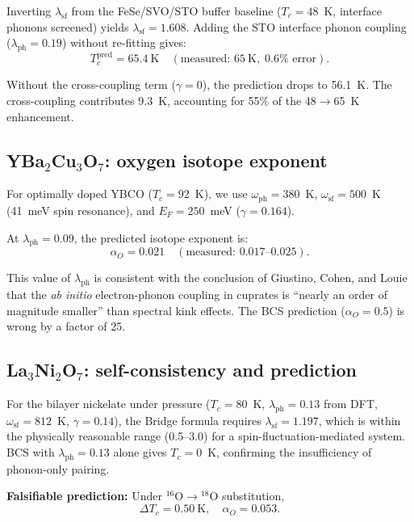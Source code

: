 \documentclass[twocolumn,showpacs,preprintnumbers,amsmath,amssymb,prb]{revtex4-2}
\begin{document}
Inverting $\lambda_{\mathrm{sf}}$ from the FeSe/SVO/STO buffer baseline ($T_c = 48$~K, interface phonons screened) yields $\lambda_{\mathrm{sf}} = 1.608$.
Adding the STO interface phonon coupling ($\lambda_{\mathrm{ph}} = 0.19$) without re-fitting gives:
\begin{equation}
T_c^{\mathrm{pred}} = 65.4~\mathrm{K} \quad (\text{measured: } 65~\mathrm{K}, \; 0.6\% \text{ error}).
\end{equation}

Without the cross-coupling term ($\gamma = 0$), the prediction drops to 56.1~K.
The cross-coupling contributes 9.3~K, accounting for 55\% of the 48$\to$65~K enhancement.

\subsection{YBa$_2$Cu$_3$O$_7$: oxygen isotope exponent}

For optimally doped YBCO ($T_c = 92$~K), we use $\omega_{\mathrm{ph}} = 380$~K, $\omega_{\mathrm{sf}} = 500$~K (41~meV spin resonance), and $E_F = 250$~meV ($\gamma = 0.164$).

At $\lambda_{\mathrm{ph}} = 0.09$, the predicted isotope exponent is:
\begin{equation}
\alpha_O = 0.021 \quad (\text{measured: } 0.017\text{--}0.025).
\end{equation}

This value of $\lambda_{\mathrm{ph}}$ is consistent with the conclusion of Giustino, Cohen, and Louie~\cite{Giustino2008} that the \textit{ab initio} electron-phonon coupling in cuprates is ``nearly an order of magnitude smaller'' than spectral kink effects.
The BCS prediction ($\alpha_O = 0.5$) is wrong by a factor of 25.

\subsection{La$_3$Ni$_2$O$_7$: self-consistency and prediction}

For the bilayer nickelate under pressure ($T_c = 80$~K, $\lambda_{\mathrm{ph}} = 0.13$ from DFT, $\omega_{\mathrm{sf}} = 812$~K, $\gamma = 0.14$), the Bridge formula requires $\lambda_{\mathrm{sf}} = 1.197$, which is within the physically reasonable range (0.5--3.0) for a spin-fluctuation-mediated system.
BCS with $\lambda_{\mathrm{ph}} = 0.13$ alone gives $T_c = 0$~K, confirming the insufficiency of phonon-only pairing.

\textbf{Falsifiable prediction:} Under $^{16}$O$\to$$^{18}$O substitution,
\begin{equation}
\Delta T_c = 0.50~\mathrm{K}, \quad \alpha_O = 0.053.
\end{equation}
\end{document}
